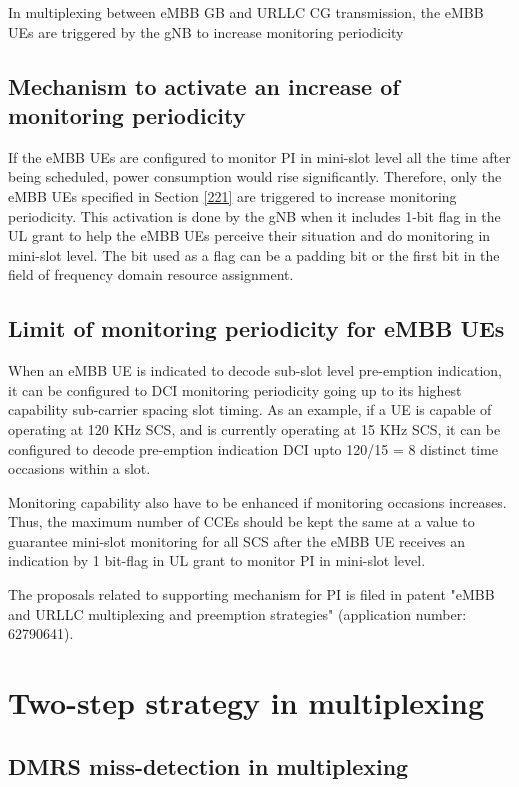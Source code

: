 \documentclass{report}
\begin{document}
In multiplexing between eMBB GB and URLLC CG transmission, the eMBB UEs are triggered by the gNB to increase monitoring periodicity

\subsection{Mechanism to activate an increase of monitoring periodicity} \label{222}
If the eMBB UEs are configured to monitor PI in mini-slot level all the time after being scheduled, power consumption would rise significantly. Therefore, only the eMBB UEs specified in Section \ref{221} are triggered to increase monitoring periodicity. This activation is done by the gNB when it includes 1-bit flag in the UL grant to help the eMBB UEs perceive their situation and do monitoring in mini-slot level. The bit used as a flag can be a padding bit or the first bit in the field of frequency domain resource assignment.

\subsection{Limit of monitoring periodicity for eMBB UEs}
When an eMBB UE is indicated to decode sub-slot level pre-emption indication, it can be configured to DCI monitoring periodicity going up to its highest capability sub-carrier spacing slot timing. As an example, if a UE is capable of operating at 120 KHz SCS, and is currently operating at 15 KHz SCS, it can be configured to decode pre-emption indication DCI upto 120/15 = 8 distinct time occasions within a slot.

Monitoring capability also have to be enhanced if monitoring occasions increases. Thus, the maximum number of CCEs should be kept the same at a value to guarantee mini-slot monitoring for all SCS after the eMBB UE receives an indication by 1 bit-flag in UL grant to monitor PI in mini-slot level.

The proposals related to supporting mechanism for PI is filed in patent "eMBB and URLLC multiplexing and preemption strategies" (application number: 62790641). 

\section{Two-step strategy in multiplexing}\label{23}
\subsection{DMRS miss-detection in multiplexing}
\end{document}
